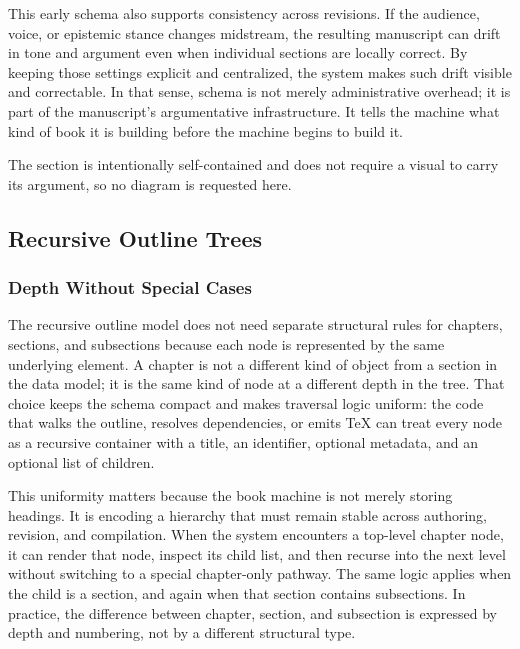 \documentclass[11pt]{article}
\begin{document}
This early schema also supports consistency across revisions. If the audience, voice, or epistemic stance changes midstream, the resulting manuscript can drift in tone and argument even when individual sections are locally correct. By keeping those settings explicit and centralized, the system makes such drift visible and correctable. In that sense, schema is not merely administrative overhead; it is part of the manuscript's argumentative infrastructure. It tells the machine what kind of book it is building before the machine begins to build it.

The section is intentionally self-contained and does not require a visual to carry its argument, so no diagram is requested here.



\subsection{Recursive Outline Trees}

\subsubsection{Depth Without Special Cases}


The recursive outline model does not need separate structural rules for chapters, sections, and subsections because each node is represented by the same underlying element. A chapter is not a different kind of object from a section in the data model; it is the same kind of node at a different depth in the tree. That choice keeps the schema compact and makes traversal logic uniform: the code that walks the outline, resolves dependencies, or emits TeX can treat every node as a recursive container with a title, an identifier, optional metadata, and an optional list of children.

This uniformity matters because the book machine is not merely storing headings. It is encoding a hierarchy that must remain stable across authoring, revision, and compilation. When the system encounters a top-level chapter node, it can render that node, inspect its child list, and then recurse into the next level without switching to a special chapter-only pathway. The same logic applies when the child is a section, and again when that section contains subsections. In practice, the difference between chapter, section, and subsection is expressed by depth and numbering, not by a different structural type.
\end{document}
